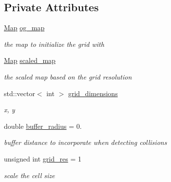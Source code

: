 \subsection*{Private Attributes}
\begin{DoxyCompactItemize}
\item 
\mbox{\label{classgrid_1_1Grid_a611cf14f1d75f0c77a7a5bcbc8fee6e0}} 
\hyperlink{structgrid_1_1Map}{Map} \hyperlink{classgrid_1_1Grid_a611cf14f1d75f0c77a7a5bcbc8fee6e0}{og\+\_\+map}
\begin{DoxyCompactList}\small\item\em the map to initialize the grid with \end{DoxyCompactList}\item 
\mbox{\label{classgrid_1_1Grid_ab990be4a53fd45a83df3f823f7098d56}} 
\hyperlink{structgrid_1_1Map}{Map} \hyperlink{classgrid_1_1Grid_ab990be4a53fd45a83df3f823f7098d56}{scaled\+\_\+map}
\begin{DoxyCompactList}\small\item\em the scaled map based on the grid resolution \end{DoxyCompactList}\item 
\mbox{\label{classgrid_1_1Grid_a375f27f536721667f4487b74982c154a}} 
std\+::vector$<$ int $>$ \hyperlink{classgrid_1_1Grid_a375f27f536721667f4487b74982c154a}{grid\+\_\+dimensions}
\begin{DoxyCompactList}\small\item\em x, y \end{DoxyCompactList}\item 
\mbox{\label{classgrid_1_1Grid_aae353051de1a48dd8f29e1889d71bf88}} 
double \hyperlink{classgrid_1_1Grid_aae353051de1a48dd8f29e1889d71bf88}{buffer\+\_\+radius} = 0.
\begin{DoxyCompactList}\small\item\em buffer distance to incorporate when detecting collisions \end{DoxyCompactList}\item 
\mbox{\label{classgrid_1_1Grid_a574ec32cb3346c1be8de79ccc38cd47b}} 
unsigned int \hyperlink{classgrid_1_1Grid_a574ec32cb3346c1be8de79ccc38cd47b}{grid\+\_\+res} = 1
\begin{DoxyCompactList}\small\item\em scale the cell size \end{DoxyCompactList}\item 

\end{DoxyCompactItemize}
